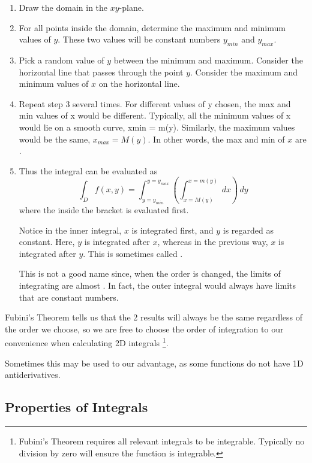 \begin{enumerate}
    \item Draw the domain in the $xy$-plane.

    \item For all points inside the domain, determine the maximum and minimum values of $y$. These two values will be constant numbers $y_{min}$ and $y_{max}$.

    \item Pick a random value of $y$ between the minimum and maximum. Consider the horizontal line that passes through the point $y$. Consider the maximum and minimum values of $x$ on the horizontal line. 

    \item Repeat step 3 several times. For different values of y chosen, the max and min values of x would be different. Typically, all the minimum values of x would lie on a smooth curve, xmin = m(y). Similarly, the maximum values would be the same, $x_{max} = M(y)$. In other words, the max and min of $x$ are .

    \item Thus the integral can be evaluated as $$\int_D f(x, y) = \int_{y=y_{min}}^{y=y_{max}} \left( \int_{x=M(y)}^{x=m(y)} \,dx \right) \,dy$$ where the  inside the bracket is evaluated first. 
    
    Notice in the inner integral, $x$ is integrated first, and $y$ is regarded as constant. Here, $y$ is integrated after $x$, whereas in the previous way, $x$ is integrated after $y$. This is sometimes called .

    This is not a good name since, when the order is changed, the limits of integrating are almost . In fact, the outer integral would always have limits that are constant numbers.
\end{enumerate}

Fubini's Theorem tells us that the 2 results will always be the same regardless of the order we choose, so we are free to choose the order of integration to our convenience when calculating 2D integrals \footnote{Fubini's Theorem requires all relevant integrals to be integrable. Typically no division by zero will ensure the function is integrable. }. 

Sometimes this may be used to our advantage, as some functions do not have 1D antiderivatives.

\subsection*{Properties of Integrals}


